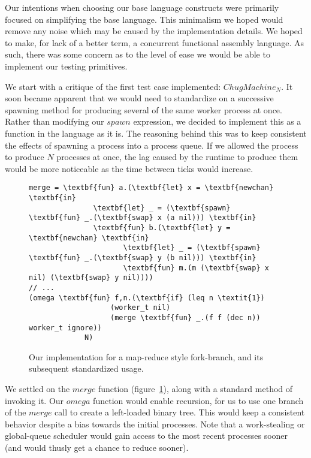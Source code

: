 Our intentions when choosing our base language constructs were primarily focused on 
simplifying the base language. This minimalism we hoped would remove any noise 
which may be caused by the implementation details. We hoped to make, for lack of a better
term, a concurrent functional assembly language. As such, there was some concern
as to the level of ease we would be able to implement our testing primitives.

We start with a critique of the first test case implemented: $ChugMachine_N$. It
soon became apparent that we would need to standardize on a successive spawning
method for producing several of the same worker process at once. Rather than modifying
our $spawn$ expression, we decided to implement this as a function in the language
as it is. The reasoning behind this was to keep consistent the effects of 
spawning a process into a process queue. If we allowed the process to produce $N$
processes at once, the lag caused by the runtime to produce them would be 
more noticeable as the time between ticks would increase.

\begin{figure}
    \centering
{\footnotesize
\begin{BVerbatim}[commandchars=\\\{\}]
merge = \textbf{fun} a.(\textbf{let} x = \textbf{newchan} \textbf{in}
               \textbf{let} _ = (\textbf{spawn} \textbf{fun} _.(\textbf{swap} x (a nil))) \textbf{in}
               \textbf{fun} b.(\textbf{let} y = \textbf{newchan} \textbf{in} 
                      \textbf{let} _ = (\textbf{spawn} \textbf{fun} _.(\textbf{swap} y (b nil))) \textbf{in}
                      \textbf{fun} m.(m (\textbf{swap} x nil) (\textbf{swap} y nil))))
// ...
(omega \textbf{fun} f,n.(\textbf{if} (leq n \textit{1}) 
                   (worker_t nil) 
                   (merge \textbf{fun} _.(f f (dec n)) worker_t ignore)) 
             N)
\end{BVerbatim}
}
    \caption{Our implementation for a map-reduce style fork-branch, and its 
    subsequent standardized usage.}
    \label{fig:merge-code}
\end{figure}

We settled on the $merge$ function (figure~\ref{fig:merge-code}), along with a 
standard method of invoking it. Our $omega$ function would enable recursion, 
for us to use one branch of the $merge$ call to create a left-loaded binary
tree. This would keep a consistent behavior despite a bias towards the initial 
processes. Note that a work-stealing or global-queue scheduler would gain
access to the most recent processes sooner (and would thusly get a chance to
reduce sooner). 

